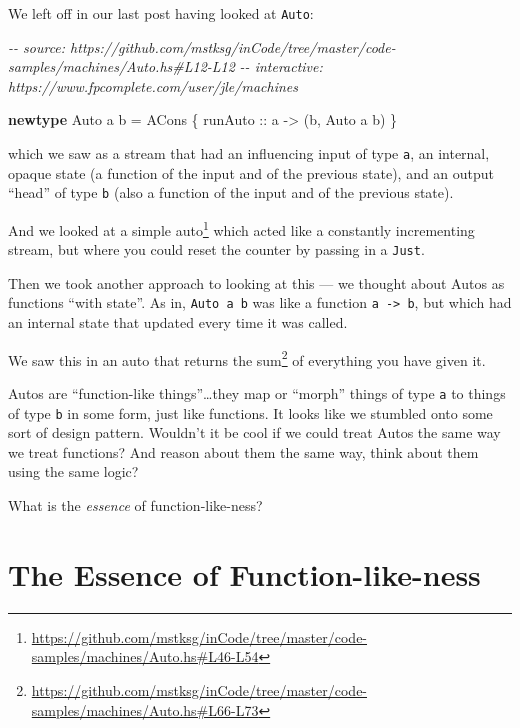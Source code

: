 \documentclass[]{article}
\newenvironment{Shaded}{}{}
\newcommand{\CommentTok}[1]{\textcolor[rgb]{0.38,0.63,0.69}{\textit{#1}}}
\newcommand{\DataTypeTok}[1]{\textcolor[rgb]{0.56,0.13,0.00}{#1}}
\newcommand{\KeywordTok}[1]{\textcolor[rgb]{0.00,0.44,0.13}{\textbf{#1}}}
\newcommand{\NormalTok}[1]{#1}
\newcommand{\OtherTok}[1]{\textcolor[rgb]{0.00,0.44,0.13}{#1}}
\renewcommand{\href}[2]{#2\footnote{\url{#1}}}
\begin{document}
We left off in our last post having looked at \texttt{Auto}:

\begin{Shaded}
\begin{Highlighting}[]
\CommentTok{{-}{-} source: https://github.com/mstksg/inCode/tree/master/code{-}samples/machines/Auto.hs\#L12{-}L12}
\CommentTok{{-}{-} interactive: https://www.fpcomplete.com/user/jle/machines}

\KeywordTok{newtype} \DataTypeTok{Auto}\NormalTok{ a b }\OtherTok{=} \DataTypeTok{ACons}\NormalTok{ \{}\OtherTok{ runAuto ::}\NormalTok{ a }\OtherTok{{-}\textgreater{}}\NormalTok{ (b, }\DataTypeTok{Auto}\NormalTok{ a b) \}}
\end{Highlighting}
\end{Shaded}

which we saw as a stream that had an influencing input of type \texttt{a}, an
internal, opaque state (a function of the input and of the previous state), and
an output ``head'' of type \texttt{b} (also a function of the input and of the
previous state).

And we looked at
\href{https://github.com/mstksg/inCode/tree/master/code-samples/machines/Auto.hs\#L46-L54}{a
simple auto} which acted like a constantly incrementing stream, but where you
could reset the counter by passing in a \texttt{Just}.

Then we took another approach to looking at this --- we thought about Autos as
functions ``with state''. As in, \texttt{Auto\ a\ b} was like a function
\texttt{a\ -\textgreater{}\ b}, but which had an internal state that updated
every time it was called.

We saw this in an auto that
\href{https://github.com/mstksg/inCode/tree/master/code-samples/machines/Auto.hs\#L66-L73}{returns
the sum} of everything you have given it.

Autos are ``function-like things''\ldots they map or ``morph'' things of type
\texttt{a} to things of type \texttt{b} in some form, just like functions. It
looks like we stumbled onto some sort of design pattern. Wouldn't it be cool if
we could treat Autos the same way we treat functions? And reason about them the
same way, think about them using the same logic?

What is the \emph{essence} of function-like-ness?

\section{The Essence of
Function-like-ness}\label{the-essence-of-function-like-ness}
\end{document}

